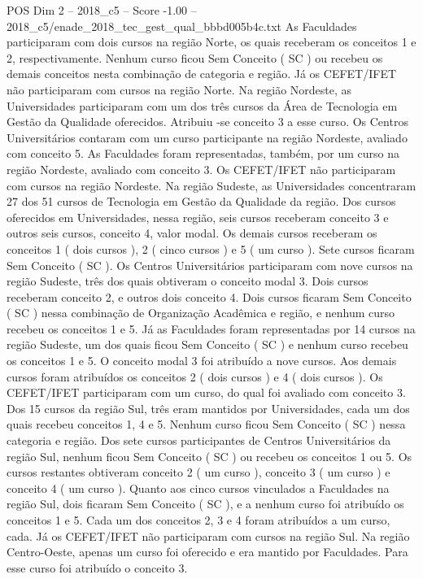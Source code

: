\begin{textsample}{POS Dim 2 – 2018\_c5 – Score -1.00 – 2018\_c5/enade\_2018\_tec\_gest\_qual\_bbbd005b4c.txt}
As Faculdades participaram com dois cursos na região Norte, os quais receberam os conceitos 1 e 2, respectivamente.
Nenhum curso ficou Sem Conceito ( SC ) ou recebeu os demais conceitos nesta combinação de categoria e região.
Já os CEFET/IFET não participaram com cursos na região Norte.
Na região Nordeste, as Universidades participaram com um dos três cursos da Área de Tecnologia em Gestão da Qualidade oferecidos.
Atribuiu -se conceito 3 a esse curso.
Os Centros Universitários contaram com um curso participante na região Nordeste, avaliado com conceito 5.
As Faculdades foram representadas, também, por um curso na região Nordeste, avaliado com conceito 3.
Os CEFET/IFET não participaram com cursos na região Nordeste.
Na região Sudeste, as Universidades concentraram 27 dos 51 cursos de Tecnologia em Gestão da Qualidade da região.
Dos cursos oferecidos em Universidades, nessa região, seis cursos receberam conceito 3 e outros seis cursos, conceito 4, valor modal.
Os demais cursos receberam os conceitos 1 ( dois cursos ), 2 ( cinco cursos ) e 5 ( um curso ).
Sete cursos ficaram Sem Conceito ( SC ).
Os Centros Universitários participaram com nove cursos na região Sudeste, três dos quais obtiveram o conceito modal 3.
Dois cursos receberam conceito 2, e outros dois conceito 4.
Dois cursos ficaram Sem Conceito ( SC ) nessa combinação de Organização Acadêmica e região, e nenhum curso recebeu os conceitos 1 e 5.
Já as Faculdades foram representadas por 14 cursos na região Sudeste, um dos quais ficou Sem Conceito ( SC ) e nenhum curso recebeu os conceitos 1 e 5.
O conceito modal 3 foi atribuído a nove cursos.
Aos demais cursos foram atribuídos os conceitos 2 ( dois cursos ) e 4 ( dois cursos ).
Os CEFET/IFET participaram com um curso, do qual foi avaliado com conceito 3.
Dos 15 cursos da região Sul, três eram mantidos por Universidades, cada um dos quais recebeu conceitos 1, 4 e 5.
Nenhum curso ficou Sem Conceito ( SC ) nessa categoria e região.
Dos sete cursos participantes de Centros Universitários da região Sul, nenhum ficou Sem Conceito ( SC ) ou recebeu os conceitos 1 ou 5.
Os cursos restantes obtiveram conceito 2 ( um curso ), conceito 3 ( um curso ) e conceito 4 ( um curso ).
Quanto aos cinco cursos vinculados a Faculdades na região Sul, dois ficaram Sem Conceito ( SC ), e a nenhum curso foi atribuído os conceitos 1 e 5.
Cada um dos conceitos 2, 3 e 4 foram atribuídos a um curso, cada.
Já os CEFET/IFET não participaram com cursos na região Sul.
Na região Centro-Oeste, apenas um curso foi oferecido e era mantido por Faculdades.
Para esse curso foi atribuído o conceito 3.

\end{textsample}
